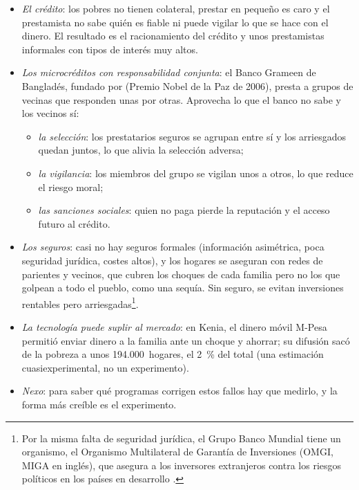 \documentclass[11pt]{article}
\begin{document}
\begin{itemize}
\item \emph{El crédito}: los pobres no tienen colateral, prestar en pequeño es caro y el prestamista no sabe quién es fiable ni puede vigilar lo que se hace con el dinero. El resultado es el racionamiento del crédito\nocite{StiglitzWeiss1981Credit}  y unos prestamistas informales con tipos de interés muy altos.
\item \emph{Los microcréditos con responsabilidad conjunta}: el Banco Grameen de Bangladés, fundado por  (Premio Nobel de la Paz de 2006), presta a grupos de vecinas que responden unas por otras. Aprovecha lo que el banco no sabe y los vecinos sí:
  \begin{itemize}
  \item \emph{la selección}: los prestatarios seguros se agrupan entre sí y los arriesgados quedan juntos, lo que alivia la selección adversa\nocite{Ghatak1999Group,GhatakGuinnane1999};
  \item \emph{la vigilancia}: los miembros del grupo se vigilan unos a otros, lo que reduce el riesgo moral\nocite{Stiglitz1990Peer};
  \item \emph{las sanciones sociales}: quien no paga pierde la reputación y el acceso futuro al crédito.
  \end{itemize}
\item \emph{Los seguros}: casi no hay seguros formales (información asimétrica, poca seguridad jurídica, costes altos), y los hogares se aseguran con redes de parientes y vecinos, que cubren los choques de cada familia pero no los que golpean a todo el pueblo, como una sequía. Sin seguro, se evitan inversiones rentables pero arriesgadas\footnote{Por la misma falta de seguridad jurídica, el Grupo Banco Mundial tiene un organismo, el Organismo Multilateral de Garantía de Inversiones (OMGI, MIGA en inglés), que asegura a los inversores extranjeros contra los riesgos políticos en los países en desarrollo .}.
\item \emph{La tecnología puede suplir al mercado}: en Kenia, el dinero móvil M-Pesa permitió enviar dinero a la familia ante un choque y ahorrar; su difusión sacó de la pobreza a unos 194.000~hogares, el 2~\% del total\nocite{SuriJack2016} (una estimación cuasiexperimental, no un experimento).
\item \emph{Nexo}: para saber qué programas corrigen estos fallos hay que medirlo, y la forma más creíble es el experimento.
\end{itemize}
\end{document}

